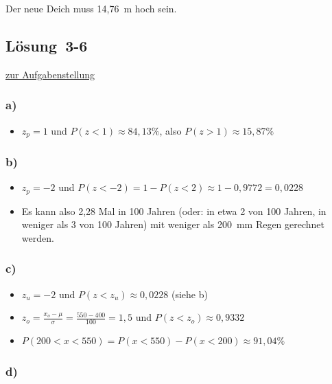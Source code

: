 \documentclass[
  11pt,
  ngerman,
  a4paper,
]{report}
\providecommand{\tightlist}{%
  \setlength{\itemsep}{0pt}\setlength{\parskip}{0pt}}
\begin{document}
Der neue Deich muss 14,76~m hoch sein.

\hypertarget{loesung-3-6}{%
\subsection{Lösung~3-6}\label{loesung-3-6}}

\protect\hyperlink{aufgabe-3-6}{zur Aufgabenstellung}

\hypertarget{a-13}{%
\subsubsection{a)}\label{a-13}}

\begin{itemize}
\tightlist
\item
  \(z_p=1\) und \(P(z<1)\approx84,13\%\), also \(P(z>1)\approx15,87\%\)
\end{itemize}

\hypertarget{b-13}{%
\subsubsection{b)}\label{b-13}}

\begin{itemize}
\tightlist
\item
  \(z_p=-2\) und \(P(z<-2) = 1-P(z<2) \approx 1-0,9772 = 0,0228\)
\item
  Es kann also 2,28 Mal in 100 Jahren (oder: in etwa 2 von 100 Jahren, in weniger als 3 von 100 Jahren) mit weniger als 200~mm Regen gerechnet werden.
\end{itemize}

\hypertarget{c-11}{%
\subsubsection{c)}\label{c-11}}

\begin{itemize}
\tightlist
\item
  \(z_u=-2\) und \(P(z<z_u)\approx 0,0228\) (siehe b)
\item
  \(z_o=\frac{x_o- \mu}{\sigma}=\frac{550-400}{100}=1,5\) und \(P(z<z_o) \approx 0,9332\)
\item
  \(P(200 < x < 550) = P(x < 550) - P(x<200) \approx 91,04\%\)
\end{itemize}

\hypertarget{d-5}{%
\subsubsection{d)}\label{d-5}}
\end{document}
